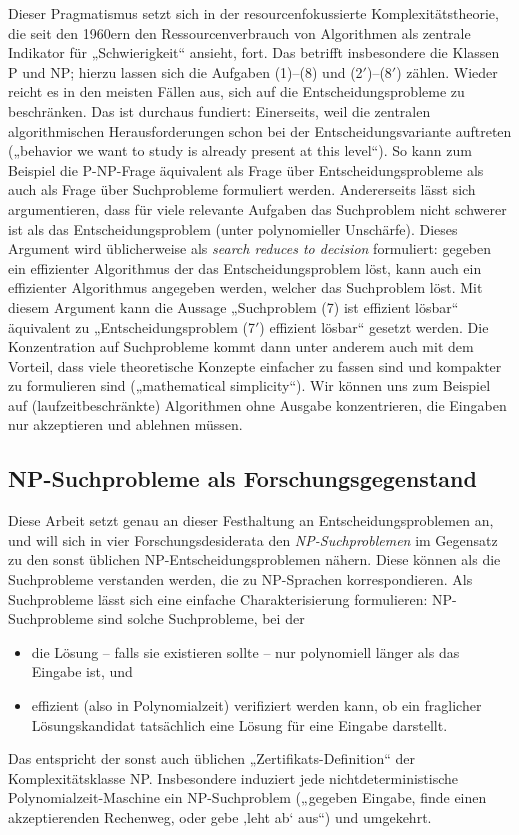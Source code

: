 Dieser Pragmatismus setzt sich in der resourcenfokussierte Komplexitätstheorie, die seit den 1960ern den Ressourcenverbrauch von Algorithmen als zentrale Indikator für „Schwierigkeit“ ansieht, fort. Das betrifft insbesondere die Klassen P und NP; hierzu lassen sich die Aufgaben (1)--(8) und (2$'$)--(8$'$) zählen.
Wieder reicht es in den meisten Fällen aus, sich auf die Entscheidungsprobleme zu beschränken.
Das ist durchaus fundiert:
Einerseits, weil die zentralen algorithmischen Herausforderungen schon bei der Entscheidungsvariante auftreten („behavior we want to study is already present at this level“). So kann zum Beispiel die P-NP-Frage äquivalent als Frage über Entscheidungsprobleme als auch als Frage über Suchprobleme formuliert werden. Andererseits lässt sich argumentieren, dass für viele relevante Aufgaben das Suchproblem nicht schwerer ist als das Entscheidungsproblem (unter polynomieller Unschärfe). Dieses Argument wird üblicherweise als \emph{search reduces to decision} formuliert: gegeben ein effizienter Algorithmus der das Entscheidungsproblem löst, kann auch ein effizienter Algorithmus angegeben werden, welcher das Suchproblem löst. Mit diesem Argument kann die Aussage „Suchproblem (7) ist effizient lösbar“ äquivalent zu „Entscheidungsproblem (7$'$) effizient lösbar“ gesetzt werden. Die Konzentration auf Suchprobleme kommt dann unter anderem auch mit dem Vorteil, dass viele theoretische Konzepte einfacher zu fassen sind und kompakter zu formulieren sind („mathematical simplicity“). Wir können uns zum Beispiel auf (laufzeitbeschränkte) Algorithmen ohne Ausgabe konzentrieren, die Eingaben nur akzeptieren und ablehnen müssen. 

\subsection*{NP-Suchprobleme als Forschungsgegenstand}

Diese Arbeit setzt genau an dieser Festhaltung an Entscheidungsproblemen an, und will sich in vier Forschungsdesiderata den \emph{NP-Suchproblemen} im Gegensatz zu den sonst üblichen NP-Entscheidungsproblemen nähern.
Diese können als die Suchprobleme verstanden werden, die zu NP-Sprachen korrespondieren. Als Suchprobleme lässt sich eine einfache Charakterisierung formulieren: NP-Suchprobleme sind solche Suchprobleme, bei der 
\begin{itemize}[noitemsep]
    \item die Lösung -- falls sie existieren sollte -- nur polynomiell länger als das Eingabe ist, und 
    \item effizient (also in Polynomialzeit) verifiziert werden kann, ob ein fraglicher Lösungskandidat tatsächlich eine Lösung für eine Eingabe darstellt.
\end{itemize}
Das entspricht der sonst auch üblichen „Zertifikats-Definition“ der Komplexitätsklasse NP. Insbesondere induziert jede nichtdeterministische Polynomialzeit-Maschine ein NP-Suchproblem („gegeben Eingabe, finde einen akzeptierenden Rechenweg, oder gebe ‚leht ab‘ aus“) und umgekehrt.

